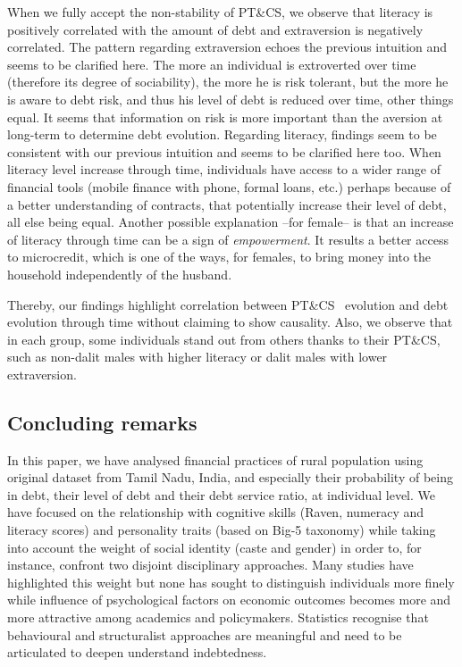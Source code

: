 \documentclass[a4paper, 12pt, onecolumn]{article}
\newcommand{\aebe}{all else being equal}
\newcommand{\ote}{other things equal}
\newcommand{\PTCS}{PT\&CS}
\begin{document}
When we fully accept the non-stability of \PTCS, we observe that literacy is positively correlated with the amount of debt and extraversion is negatively correlated.
The pattern regarding extraversion echoes the previous intuition and seems to be clarified here.
The more an individual is extroverted over time (therefore its degree of sociability), the more he is risk tolerant, but the more he is aware to debt risk, and thus his level of debt is reduced over time, \ote.
It seems that information on risk is more important than the aversion at long-term to determine debt evolution.
Regarding literacy, findings seem to be consistent with our previous intuition and seems to be clarified here too.
When literacy level increase through time, individuals have access to a wider range of financial tools (mobile finance with phone, formal loans, etc.) perhaps because of a better understanding of contracts, that potentially increase their level of debt, \aebe.
Another possible explanation --for female-- is that an increase of literacy through time can be a sign of \textit{empowerment}.
It results a better access to microcredit, which is one of the ways, for females, to bring money into the household independently of the husband.

Thereby, our findings highlight correlation between \PTCS~ evolution and debt evolution through time without claiming to show causality.
Also, we observe that in each group, some individuals stand out from others thanks to their \PTCS, such as non-dalit males with higher literacy or dalit males with lower extraversion.



	\subsection{Concluding remarks}

In this paper, we have analysed financial practices of rural population using original dataset from Tamil Nadu, India, and especially their probability of being in debt, their level of debt and their debt service ratio, at individual level.
We have focused on the relationship with cognitive skills (Raven, numeracy and literacy scores) and personality traits (based on Big-5 taxonomy) while taking into account the weight of social identity (caste and gender) in order to, for instance, confront two disjoint disciplinary approaches.
Many studies have highlighted this weight but none has sought to distinguish individuals more finely while influence of psychological factors on economic outcomes becomes more and more attractive among academics and policymakers.
Statistics recognise that behavioural and structuralist approaches are meaningful and need to be articulated to deepen understand indebtedness.
\end{document}
